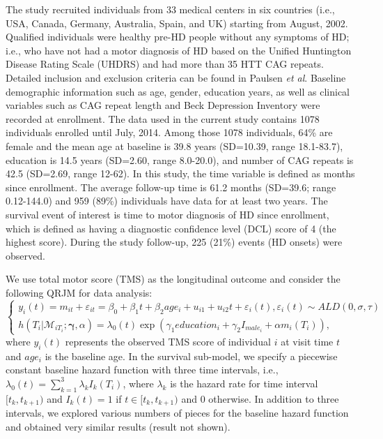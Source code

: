 \documentclass[Crown, sagev, times, doublespace]{sagej}
\begin{document}
The study recruited individuals from 33 medical centers in six countries (i.e., USA, Canada, Germany, Australia, Spain, and UK) starting from August, 2002. Qualified individuals were healthy pre-HD people without any symptoms of HD; i.e., who have not had a motor diagnosis of HD based on the Unified Huntington Disease Rating Scale (UHDRS) and had more than 35 HTT CAG repeats. Detailed inclusion and exclusion criteria can be found in Paulsen \emph{et al}.\cite{paulsen2006preparing} Baseline demographic information such as age, gender, education years, as well as clinical variables such as CAG repeat length and Beck Depression Inventory were recorded at enrollment. The data used in the current study contains 1078 individuals enrolled until July, 2014. Among those 1078 individuals, 64\% are female and the mean age at baseline is 39.8 years (SD=10.39, range 18.1-83.7), education is 14.5 years (SD=2.60, range 8.0-20.0), and number of CAG repeats is 42.5 (SD=2.69, range 12-62). In this study, the time variable is defined as months since enrollment. The average follow-up time is 61.2 months (SD=39.6; range 0.12-144.0) and 959 (89\%) individuals have data for at least two years. The survival event of interest is time to motor diagnosis of HD since enrollment, which is defined as having a diagnostic confidence level (DCL) score of 4 (the highest score).\citep{paulsen2014prediction} During the study follow-up, 225 (21\%) events (HD onsets) were observed.

We use total motor score (TMS) as the longitudinal outcome and consider the following QRJM for data analysis:
\begin{equation*}\label{eqn:data_joint}
\left\{
\begin{array}{l}
y_{i}(t) = m_{it} + \varepsilon_{it} = \beta_0 + \beta_1 t+ \beta_2 age_i + {u}_{i1} + u_{i2} t + \varepsilon_{i}(t),  \varepsilon_{i}(t)\sim ALD(0, \sigma, \tau)\\
h(T_i|\mathcal{M}_{iT_i};  \boldsymbol{\gamma}, \alpha) = \lambda_0(t)\exp(\gamma_1 education_i + \gamma_2 I_{male_i} + \alpha m_i(T_i)),
\end{array}
\right.
\end{equation*}
where $y_{i}(t)$ represents the observed TMS score of individual $i$ at visit time $t$ and $age_i$ is the baseline age. In the survival sub-model, we specify a piecewise constant baseline hazard function with three time intervals, i.e., $\lambda_0(t) = \sum_{k=1}^3\lambda_kI_k(T_i)$, where $\lambda_k$ is the hazard rate for time interval $[t_k, t_{k+1})$ and $I_k(t)=1$ if $t\in[t_k, t_{k+1})$ and 0 otherwise. In addition to three intervals, we explored various numbers of pieces for the baseline hazard function and obtained very similar results (result not shown).
\end{document}
